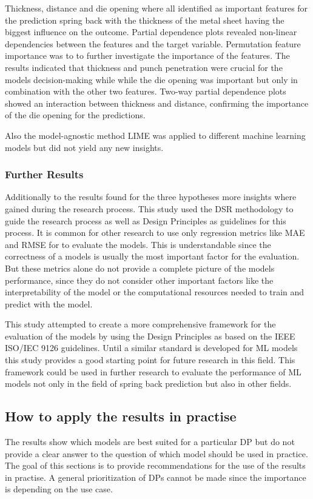 Thickness, distance and die opening where all identified as important features for the prediction spring back with the
thickness of the metal sheet having the biggest influence on the outcome.
Partial dependence plots revealed non-linear dependencies between the features and the target variable.
Permutation feature importance was to to further investigate the importance of the features.
The results indicated that thickness and punch penetration were crucial for the models decision-making while while the
die opening was important but only in combination with the other two features.
Two-way partial dependence plots showed an interaction between thickness and distance, confirming the importance of the
die opening for the predictions.

Also the model-agnostic method LIME was applied to different machine learning models but did not yield any new insights.

\subsubsection*{Further Results}
Additionally to the results found for the three hypotheses more insights where gained during the research process.
This study used the \ac{DSR} methodology to guide the research process as well as Design Principles as guidelines for
this process.
It is common for other research to use only regression metrics like MAE and RMSE for to evaluate the models.
This is understandable since the correctness of a models is usually the most important factor for the evaluation.
But these metrics alone do not provide a complete picture of the models performance, since they do not consider
other important factors like the interpretability of the model or the computational resources needed to train and
predict with the model.

This study attempted to create a more comprehensive framework for the evaluation of the models by using the Design
Principles as based on the IEEE ISO/IEC 9126 guidelines.
Until a similar standard is developed for \ac{ML} models this study provides a good starting point for future research
in this field.
This framework could be used in further research to evaluate the performance of \ac{ML} models not only in the field of
spring back prediction but also in other fields.


\subsection{How to apply the results in practise}\label{subsec:how-to-apply-the-results-in-practise}
The results show which models are best suited for a particular \ac{DP} but do not provide a clear answer to the
question of which model should be used in practice.
The goal of this sections is to provide recommendations for the use of the results in practise.
A general prioritization of \ac{DP}s cannot be made since the importance is depending on the use case.

